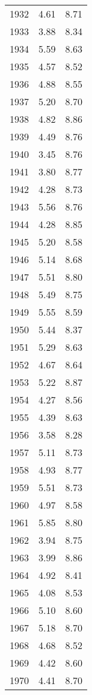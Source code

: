 \begin{longtable}{lrr}
1932 &    4.61 &    8.71 \\
1933 &    3.88 &    8.34 \\
1934 &    5.59 &    8.63 \\
1935 &    4.57 &    8.52 \\
1936 &    4.88 &    8.55 \\
1937 &    5.20 &    8.70 \\
1938 &    4.82 &    8.86 \\
1939 &    4.49 &    8.76 \\
1940 &    3.45 &    8.76 \\
1941 &    3.80 &    8.77 \\
1942 &    4.28 &    8.73 \\
1943 &    5.56 &    8.76 \\
1944 &    4.28 &    8.85 \\
1945 &    5.20 &    8.58 \\
1946 &    5.14 &    8.68 \\
1947 &    5.51 &    8.80 \\
1948 &    5.49 &    8.75 \\
1949 &    5.55 &    8.59 \\
1950 &    5.44 &    8.37 \\
1951 &    5.29 &    8.63 \\
1952 &    4.67 &    8.64 \\
1953 &    5.22 &    8.87 \\
1954 &    4.27 &    8.56 \\
1955 &    4.39 &    8.63 \\
1956 &    3.58 &    8.28 \\
1957 &    5.11 &    8.73 \\
1958 &    4.93 &    8.77 \\
1959 &    5.51 &    8.73 \\
1960 &    4.97 &    8.58 \\
1961 &    5.85 &    8.80 \\
1962 &    3.94 &    8.75 \\
1963 &    3.99 &    8.86 \\
1964 &    4.92 &    8.41 \\
1965 &    4.08 &    8.53 \\
1966 &    5.10 &    8.60 \\
1967 &    5.18 &    8.70 \\
1968 &    4.68 &    8.52 \\
1969 &    4.42 &    8.60 \\
1970 &    4.41 &    8.70 \\

\end{longtable}
